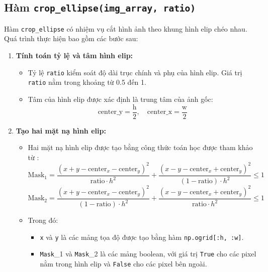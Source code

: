 \subsection{Hàm \texttt{crop\_ellipse(img\_array, ratio)}}
Hàm \texttt{crop\_ellipse} có nhiệm vụ cắt hình ảnh theo khung hình elip chéo nhau. Quá trình thực hiện bao gồm các bước sau:

\begin{enumerate}

	\item \textbf{Tính toán tỷ lệ và tâm hình elip:}
	      \begin{itemize}
		      \item Tỷ lệ \texttt{ratio} kiểm soát độ dài trục chính và phụ của hình elip. Giá trị \texttt{ratio} nằm trong khoảng từ 0.5 đến 1.
		      \item Tâm của hình elip được xác định là trung tâm của ảnh gốc:
		            \[
			            \text{center\_y} = \frac{\text{h}}{2}, \quad \text{center\_x} = \frac{\text{w}}{2}
		            \]
	      \end{itemize}

	\item \textbf{Tạo hai mặt nạ hình elip:}
	      \begin{itemize}
		      \item Hai mặt nạ hình elip được tạo bằng công thức toán học được tham khảo từ \cite{stackexchange_ellipse_dimensions}:
		            \[
			            \text{Mask}_1 = \frac{(x + y - \text{center}_x - \text{center}_y)^2}{\text{ratio} \cdot h^2} + \frac{(x - y - \text{center}_x + \text{center}_y)^2}{(1 - \text{ratio}) \cdot h^2} \leq 1
		            \]
		            \[
			            \text{Mask}_2 = \frac{(x + y - \text{center}_x - \text{center}_y)^2}{(1 - \text{ratio}) \cdot h^2} + \frac{(x - y - \text{center}_x + \text{center}_y)^2}{\text{ratio} \cdot h^2} \leq 1
		            \]
		      \item Trong đó:
		            \begin{itemize}
			            \item \texttt{x} và \texttt{y} là các mảng tọa độ được tạo bằng hàm \texttt{np.ogrid[:h, :w]}.
			            \item \texttt{Mask}\_1 và \texttt{Mask}\_2 là các mảng boolean, với giá trị \texttt{True} cho các pixel nằm trong hình elip và \texttt{False} cho các pixel bên ngoài.
		            \end{itemize}
	      \end{itemize}


\end{enumerate}
